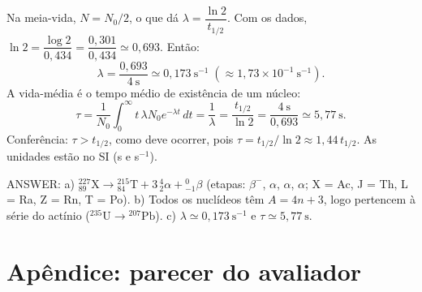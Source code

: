 \documentclass{article}%
\begin{document}
Na meia-vida, $N=N_0/2$, o que dá $\lambda=\dfrac{\ln 2}{t_{1/2}}$. Com os dados, $\ln 2=\dfrac{\log 2}{0{,}434}=\dfrac{0{,}301}{0{,}434}\simeq 0{,}693$. Então:
\[
\lambda=\frac{0{,}693}{4\ \text{s}}\simeq 0{,}173\ \text{s}^{-1}\;(\approx 1{,}73\times 10^{-1}\ \text{s}^{-1}).
\]
A vida-média é o tempo médio de existência de um núcleo:
\[
\tau=\frac{1}{N_0}\int_0^{\infty} t\,\lambda N_0 e^{-\lambda t}\,dt=\frac{1}{\lambda}=\frac{t_{1/2}}{\ln 2}=\frac{4\ \text{s}}{0{,}693}\simeq 5{,}77\ \text{s}.
\]
Conferência: $\tau>t_{1/2}$, como deve ocorrer, pois $\tau=t_{1/2}/\ln 2\approx 1{,}44\,t_{1/2}$. As unidades estão no SI (s e s$^{-1}$).

\medskip
ANSWER: a) ${}^{227}_{89}\text{X}\to{}^{215}_{84}\text{T}+3\,{}^{4}_{2}\alpha+{}^{0}_{-1}\beta$ (etapas: $\beta^-$, $\alpha$, $\alpha$, $\alpha$; X = Ac, J = Th, L = Ra, Z = Rn, T = Po). b) Todos os nuclídeos têm $A=4n+3$, logo pertencem à série do actínio (${}^{235}\text{U}\to{}^{207}\text{Pb}$). c) $\lambda\simeq 0{,}173\ \text{s}^{-1}$ e $\tau\simeq 5{,}77\ \text{s}$.%
\newpage%
\section*{Apêndice: parecer do avaliador}%
\end{document}
